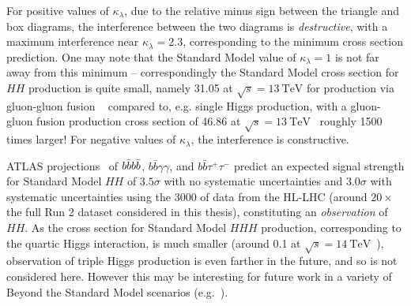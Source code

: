 For positive values of $\kappa_{\lambda}$, due to the relative minus sign between the triangle 
and box diagrams, the interference between the two diagrams is \emph{destructive}, with a maximum interference 
near $\kappa_{\lambda} = 2.3$, corresponding to the minimum cross section prediction. One may note that the 
Standard Model value of $\kappa_{\lambda} = 1$ is not far away from this minimum -- correspondingly the 
Standard Model cross section for $HH$ production is quite small, namely \SI{31.05}{\fb} at $\sqrt{s} = \SI{13}{\TeV}$ 
for production via gluon-gluon fusion ~\cite{HH1,HH2,HH3,HH4,HH5,HH6,HH7,HH8} compared to, e.g. single Higgs 
production, with a gluon-gluon fusion production cross section of \SI{46.86}{\pb} at 
$\sqrt{s} = \SI{13}{\TeV}$~\cite{Higgsxs} roughly 1500 times larger! For negative values of $\kappa_{\lambda}$, 
the interference is constructive.

ATLAS projections~\cite{ATL-PHYS-PUB-2018-053} of $b\bar{b}b\bar{b}$, $b\bar{b}\gamma\gamma$, and $b\bar{b}\tau^{+}\tau^{-}$ 
predict an expected signal strength for Standard Model $HH$ of $3.5\sigma$ with no systematic uncertainties 
and $3.0\sigma$ with systematic uncertainties using the \SI{3000}{\ifb} of data from the HL-LHC 
(around $20\times$ the full Run 2 dataset considered in this thesis), constituting an \emph{observation} of $HH$. 
As the cross section for Standard Model $HHH$ production, corresponding 
to the quartic Higgs interaction, is much smaller (around \SI{0.1}{\fb} at $\sqrt{s} = \SI{14}{\TeV}$~\cite{TripleHiggs}),
observation of triple Higgs production is even farther in the future, and so is not considered here. However this 
may be interesting for future work in a variety of Beyond the Standard Model scenarios (e.g.~\cite{HHH1,HHH2,HHH3}).

